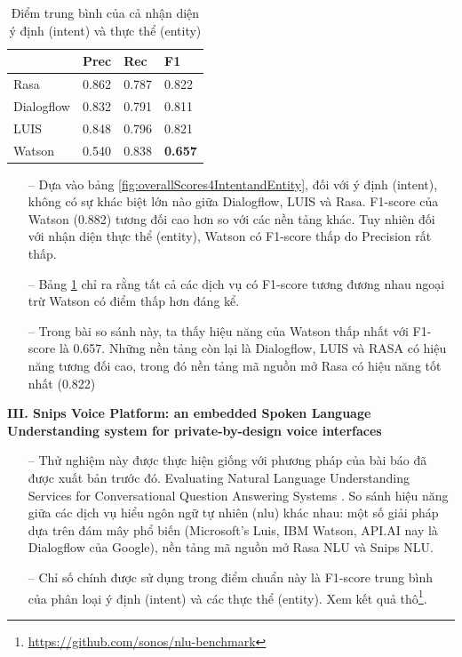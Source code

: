 \begin{table}[]
\begin{center}
\begin{tabular}{|l|l|l|l|}
\hline
\textbf{}  & Prec  & Rec   & F1             \\ \hline
Rasa       & 0.862 & 0.787 & 0.822          \\ \hline
Dialogflow & 0.832 & 0.791 & 0.811          \\ \hline
LUIS       & 0.848 & 0.796 & 0.821          \\ \hline
Watson     & 0.540 & 0.838 & \textbf{0.657} \\ \hline
\end{tabular}
    \caption{Điểm trung bình của cả nhận diện ý định (intent) và thực thể (entity)}
    \label{fig:combinedOverallScores}
    \end{center}
\end{table}

\begin{itemize}
    \item[--] Dựa vào bảng \ref{fig:overallScores4IntentandEntity}, đối với ý định (intent), không có sự khác biệt lớn nào giữa Dialogflow, LUIS và Rasa. F1-score của Watson (0.882) tương đối cao hơn so với các nền tảng khác. Tuy nhiên đối với nhận diện thực thể (entity), Watson có F1-score thấp do Precision rất thấp.
    \item[--] Bảng \ref{fig:combinedOverallScores} chỉ ra rằng tất cả các dịch vụ có F1-score tương đương nhau ngoại trừ Watson có điểm thấp hơn đáng kể.
    \item[--] Trong bài so sánh này, ta thấy hiệu năng của Watson thấp nhất với F1-score là 0.657. Những nền tảng còn lại là Dialogflow, LUIS và RASA có hiệu năng tương đối cao, trong đó nền tảng mã nguồn mở Rasa có hiệu năng tốt nhất (0.822)
\end{itemize}

\textbf{III. Snips Voice Platform: an embedded Spoken Language Understanding system for private-by-design voice interfaces}

\begin{itemize}
    \item[--] Thử nghiệm này được thực hiện giống với phương pháp của bài báo đã được xuất bản trước đó. Evaluating Natural Language Understanding Services for Conversational Question Answering Systems \cite{EvaluatingNLU}. So sánh hiệu năng giữa các dịch vụ hiểu ngôn ngữ tự nhiên (\ac{nlu}) khác nhau: một số giải pháp dựa trên đám mây phổ biến (Microsoft’s Luis, IBM Watson, API.AI nay là Dialogflow của Google), nền tảng mã nguồn mở Rasa NLU và Snips NLU.
    \item[--] Chỉ số chính được sử dụng trong điểm chuẩn này là F1-score trung bình của phân loại ý định (intent) và các thực thể (entity). Xem kết quả thô\footnote{\url{https://github.com/sonos/nlu-benchmark}}. 
\end{itemize}


